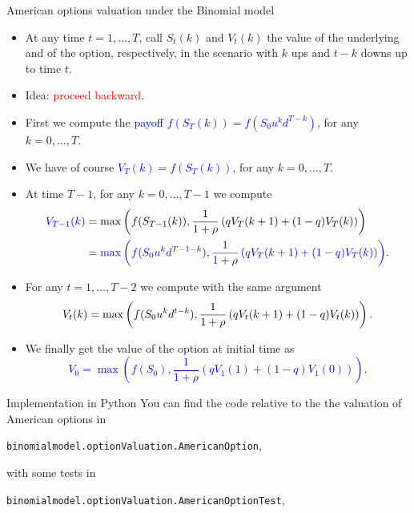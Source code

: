 \documentclass[9 pt]{beamer} %
\def \blue {\textcolor{blue}}
\def \red {\textcolor{red}}
\begin{document}
\begin{frame}{American options valuation under the Binomial model}
\begin{itemize}
\item At any time $t=1,\dots,T$, call $S_t(k)$ and $V_t(k)$ the value of the underlying and of the option, respectively, in the scenario with $k$ ups and $t-k$ downs up to time $t$.
\item Idea: \red{proceed backward}.
\item First we compute the \blue{payoff $f(S_T(k))=f(S_0u^kd^{T-k})$}, for any $k=0,\dots,T$.
\item We have of course \blue{$V_T(k)=f(S_T(k))$}, for any $k=0,\dots,T$.
\item At time $T-1$, for any $k=0,\dots,T-1$ we compute
\begin{align}
\blue{V_{T-1}(k)}&=\max \left( f(S_{T-1}(k)),\frac{1}{1+\rho}\left(q V_{T}(k+1)+(1-q)V_{T}(k)\right)\right)\notag \\
&=\blue{\max \left( f(S_0u^k d^{T-1-k}),\frac{1}{1+\rho}\left(q V_{T}(k+1)+(1-q)V_{T}(k)\right)\right)}.\notag
\end{align}
\item For any $t=1,\dots, T-2$ we compute with the same argument
\blue{$$
V_{t}(k)=\max \left( f(S_0u^kd^{t-k}),\frac{1}{1+\rho}\left(q V_{t}(k+1)+(1-q)V_{t}(k)\right)\right).\notag
$$}
\item We finally get the value of the option at initial time as
\blue{$$
V_0= \max \left( f(S_0),\frac{1}{1+\rho}\left(q V_{1}(1)+(1-q)V_{1}(0)\right)\right).
$$}
\end{itemize}
\end{frame}


\begin{frame}{Implementation in Python}
You can find the code relative to the the valuation of American options in
\begin{center}
\texttt{binomialmodel.optionValuation.AmericanOption},
\end{center}
with some tests in 
\begin{center}
\texttt{binomialmodel.optionValuation.AmericanOptionTest},
\end{center}
\end{frame}
\end{document}
